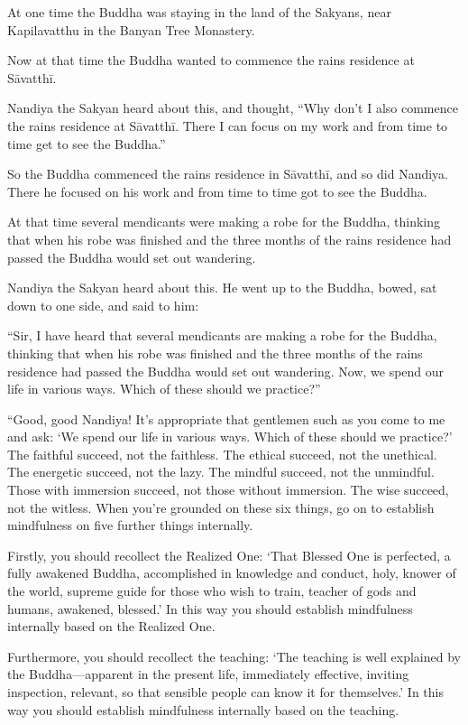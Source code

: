 \documentclass[12pt,openany]{book}%
\begin{document}
At one time the Buddha was staying in the land of the Sakyans, near Kapilavatthu in the Banyan Tree Monastery. 

Now at that time the Buddha wanted to commence the rains residence at \textsanskrit{Sāvatthī}. 

Nandiya the Sakyan heard about this, and thought, “Why don’t I also commence the rains residence at \textsanskrit{Sāvatthī}. There I can focus on my work and from time to time get to see the Buddha.” 

So the Buddha commenced the rains residence in \textsanskrit{Sāvatthī}, and so did Nandiya. There he focused on his work and from time to time got to see the Buddha. 

At that time several mendicants were making a robe for the Buddha, thinking that when his robe was finished and the three months of the rains residence had passed the Buddha would set out wandering. 

Nandiya the Sakyan heard about this. He went up to the Buddha, bowed, sat down to one side, and said to him: 

“Sir, I have heard that several mendicants are making a robe for the Buddha, thinking that when his robe was finished and the three months of the rains residence had passed the Buddha would set out wandering. Now, we spend our life in various ways. Which of these should we practice?” 

“Good, good Nandiya! It’s appropriate that gentlemen such as you come to me and ask: ‘We spend our life in various ways. Which of these should we practice?’ The faithful succeed, not the faithless. The ethical succeed, not the unethical. The energetic succeed, not the lazy. The mindful succeed, not the unmindful. Those with immersion succeed, not those without immersion. The wise succeed, not the witless. When you’re grounded on these six things, go on to establish mindfulness on five further things internally. 

Firstly, you should recollect the Realized One: ‘That Blessed One is perfected, a fully awakened Buddha, accomplished in knowledge and conduct, holy, knower of the world, supreme guide for those who wish to train, teacher of gods and humans, awakened, blessed.’ In this way you should establish mindfulness internally based on the Realized One. 

Furthermore, you should recollect the teaching: ‘The teaching is well explained by the Buddha—apparent in the present life, immediately effective, inviting inspection, relevant, so that sensible people can know it for themselves.’ In this way you should establish mindfulness internally based on the teaching. 
\end{document}
